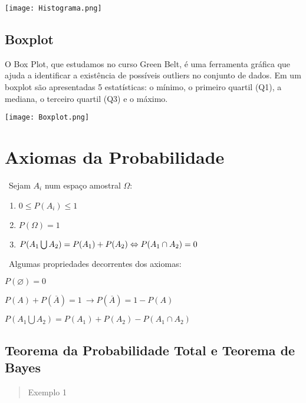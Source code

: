 \documentclass{article}
\begin{document}
\begin{multicols}{2}
      \hbox{\texttt{[image: Histograma.png]}}
      
      \subsection{Boxplot}  
      O Box Plot, que estudamos no curso Green Belt, é uma ferramenta gráfica que ajuda a identificar a existência de 
      possíveis outliers no conjunto de dados. Em um boxplot são apresentadas 5 estatísticas: o mínimo, o primeiro quartil 
      (Q1), a mediana, o terceiro quartil (Q3) e o máximo.
      
      \hbox{\texttt{[image: Boxplot.png]}}  
        
\section{Axiomas da Probabilidade}

    \ Sejam $ A_i $ num espaço amostral $ \Omega: $

    \begin{enumerate}
      \item $ 0 \leqslant P(A_i) \leqslant 1 $
      \item $ P(\Omega) = 1 $
      \item $ P(A_1 \bigcup A_2) = P(A_1) + P(A_2)\\ \Leftrightarrow P(A_1 \cap A_2) = 0 $
    \end{enumerate}

    \ Algumas propriedades decorrentes dos axiomas:
    \begin{list}{ - }{spacing}
      \item $ P( \varnothing ) = 0 $
      \item $ P(A) + P(\overset{\_}{A}) = 1 \ \rightarrow P(\overset{\_}{A}) = 1 - P(A) $
      \item $ P(A_1 \bigcup A_2) = P(A_1) + P(A_2) - P(A_1 \cap A_2) $
    \end{list}
  \end{multicols} %
\newpage

    \subsection{Teorema da Probabilidade Total e Teorema de Bayes}

    \begin{quote}
      Exemplo 1
    \end{quote}
\end{document}
